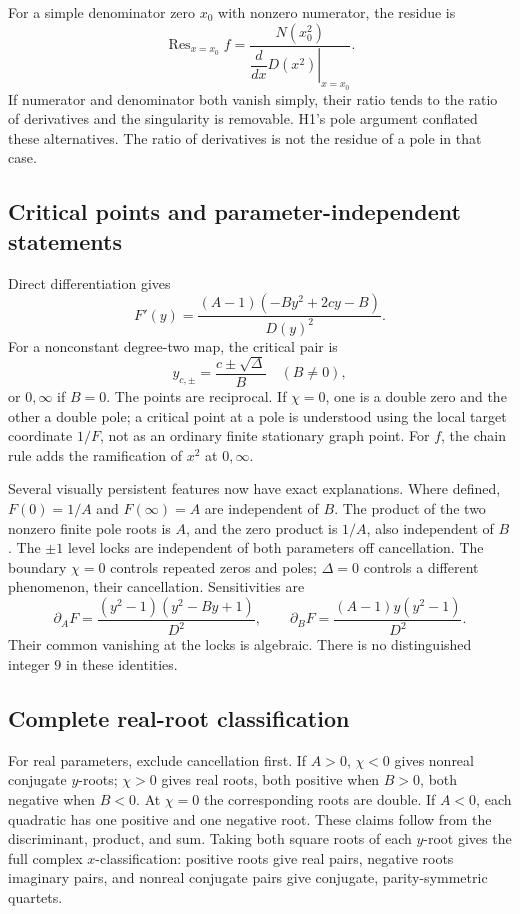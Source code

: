 For a simple denominator zero \(x_0\) with nonzero numerator, the residue is
\[
\operatorname{Res}_{x=x_0}f=\frac{N(x_0^2)}{\left.\dfrac{d}{dx}D(x^2)\right|_{x=x_0}}.
\]
If numerator and denominator both vanish simply, their ratio tends to the ratio of derivatives and the singularity is removable. H1's pole argument conflated these alternatives. The ratio of derivatives is not the residue of a pole in that case.

\subsection{Critical points and parameter-independent statements}
Direct differentiation gives
\begin{equation}\label{eq:derivative}
F'(y)=\frac{(A-1)(-By^2+2cy-B)}{D(y)^2}.
\end{equation}
For a nonconstant degree-two map, the critical pair is
\[
y_{c,\pm}=\frac{c\pm\sqrt\Delta}{B}\quad(B\ne0),
\]
or \(0,\infty\) if \(B=0\). The points are reciprocal. If \(\chi=0\), one is a double zero and the other a double pole; a critical point at a pole is understood using the local target coordinate \(1/F\), not as an ordinary finite stationary graph point. For \(f\), the chain rule adds the ramification of \(x^2\) at \(0,\infty\).

Several visually persistent features now have exact explanations. Where defined, \(F(0)=1/A\) and \(F(\infty)=A\) are independent of \(B\). The product of the two nonzero finite pole roots is \(A\), and the zero product is \(1/A\), also independent of \(B\). The \(\pm1\) level locks are independent of both parameters off cancellation. The boundary \(\chi=0\) controls repeated zeros and poles; \(\Delta=0\) controls a different phenomenon, their cancellation. Sensitivities are
\begin{equation}\label{eq:sensitivity}
\partial_A F=\frac{(y^2-1)(y^2-By+1)}{D^2},\qquad
\partial_B F=\frac{(A-1)y(y^2-1)}{D^2}.
\end{equation}
Their common vanishing at the locks is algebraic. There is no distinguished integer \(9\) in these identities.

\subsection{Complete real-root classification}
For real parameters, exclude cancellation first. If \(A>0\), \(\chi<0\) gives nonreal conjugate \(y\)-roots; \(\chi>0\) gives real roots, both positive when \(B>0\), both negative when \(B<0\). At \(\chi=0\) the corresponding roots are double. If \(A<0\), each quadratic has one positive and one negative root. These claims follow from the discriminant, product, and sum. Taking both square roots of each \(y\)-root gives the full complex \(x\)-classification: positive roots give real pairs, negative roots imaginary pairs, and nonreal conjugate pairs give conjugate, parity-symmetric quartets.

